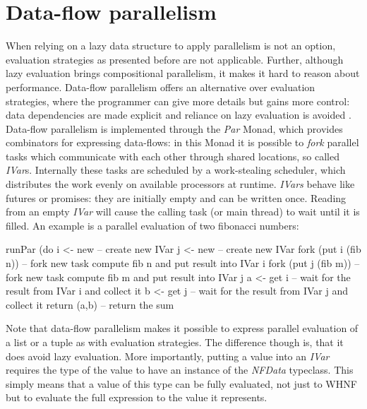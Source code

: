 \section{Data-flow parallelism}
When relying on a lazy data structure to apply parallelism is not an option, evaluation strategies as presented before are not applicable. Further, although lazy evaluation brings compositional parallelism, it makes it hard to reason about performance. Data-flow parallelism offers an alternative over evaluation strategies, where the programmer can give more details but gains more control: data dependencies are made explicit and reliance on lazy evaluation is avoided \cite{marlow_monad_2011}.
Data-flow parallelism is implemented through the \textit{Par} Monad, which provides combinators for expressing data-flows: in this Monad it is possible to \textit{fork} parallel tasks which communicate with each other through shared locations, so called \textit{IVar}s. Internally these tasks are scheduled by a work-stealing scheduler, which distributes the work evenly on available processors at runtime. \textit{IVars} behave like futures or promises: they are initially empty and can be written once. Reading from an empty \textit{IVar} will cause the calling task (or main thread) to wait until it is filled. An example is a parallel evaluation of two fibonacci numbers:

\begin{HaskellCode}
runPar (do
  i <- new             -- create new IVar
  j <- new             -- create new IVar
  fork (put i (fib n)) -- fork new task compute fib n and put result into IVar i
  fork (put j (fib m)) -- fork new task compute fib m and put result into IVar j
  a <- get i           -- wait for the result from IVar i and collect it
  b <- get j           -- wait for the result from IVar j and collect it
  return (a,b)         -- return the sum
\end{HaskellCode}

Note that data-flow parallelism makes it possible to express parallel evaluation of a list or a tuple as with evaluation strategies. The difference though is, that it does avoid lazy evaluation. More importantly, putting a value into an \textit{IVar} requires the type of the value to have an instance of the \textit{NFData} typeclass. This simply means that a value of this type can be fully evaluated, not just to WHNF but to evaluate the full expression to the value it represents.

